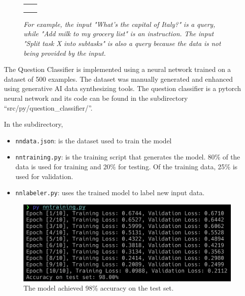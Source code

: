 \documentclass{article}
\begin{document}
\begin{figure}[H]
\begin{center}
\begin{tabular}{SS}
  \toprule
     &  \\
    \midrule
      &  \\
      &   \\
     &   \\
    \bottomrule
\end{tabular}
\end{center}
\caption{\it For example, the input "What's the capital of Italy?" is a query, while "Add milk to my grocery list" is an instruction. The input "Split task X into subtasks" is also a query because the data is not being provided by the input.} \label{faketable:mul}
\end{figure}


The Question Classifier is implemented using a neural network trained on a dataset of 500 examples. The dataset was manually generated and enhanced using generative AI data synthesizing tools. The question classifier is a pytorch neural network and its code can be found in the subdirectory ``src/py/question\_classifier/''.

In the subdirectory,
\begin{itemize}
 \item \texttt{nndata.json}: is the dataset used to train the model
  \item \texttt{nntraining.py}: is the training script that generates the model. 80\% of the data is used for training and 20\% for testing. Of the training data, 25\% is used for validation.
  \item \texttt{nnlabeler.py}: uses the trained model to label new input data.
\end{itemize}

\begin{figure}[htbp]
\centering
\includegraphics[width=\textwidth]{question_classifier_accuracy.png}
\caption{\small The model achieved 98\% accuracy on the test set.}
\end{figure}
\end{document}
